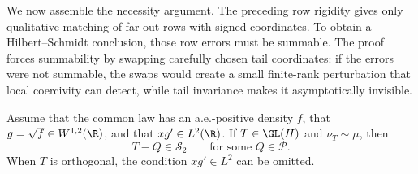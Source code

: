 We now assemble the necessity argument.
The preceding row rigidity gives only qualitative matching of far-out rows
with signed coordinates.
To obtain a Hilbert--Schmidt conclusion, those row errors must be summable.
The proof forces summability by swapping carefully chosen tail coordinates:
if the errors were not summable, the swaps would create a small finite-rank
perturbation that local coercivity can detect, while tail invariance makes
it asymptotically invisible.

\begin{lemma}
\label{lem:hilbert-schmidt-necessity}
Assume that the common law has an a.e.-positive density $f$, that
$g=\sqrt f\in W^{1,2}(\R)$, and that $xg'\in L^2(\R)$.
If $T\in\GL(H)$ and $\nu_T\sim\mu$, then
\begin{equation}
 T-Q\in\mathcal S_2
 \qquad\text{for some }Q\in\mathcal P.
 \label{eq:hilbert-schmidt-necessity}
\end{equation}
When $T$ is orthogonal, the condition $xg'\in L^2$ can be omitted.
\end{lemma}
